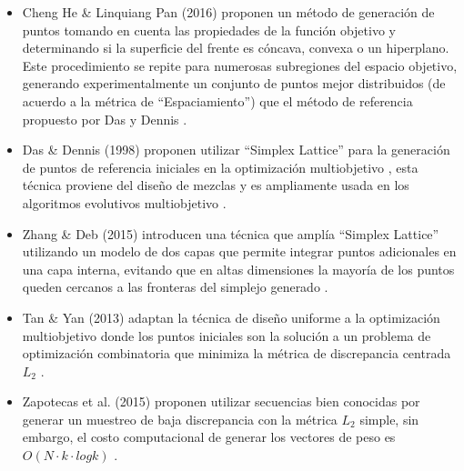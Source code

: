 \documentclass[letterpaper,10pt]{article}
\begin{document}



\begin{itemize}
 \item Cheng He \& Linquiang Pan (2016) proponen un método de generación de puntos tomando en cuenta las propiedades de la función objetivo y determinando si la superficie del frente es cóncava, convexa o un hiperplano. Este procedimiento se repite para numerosas subregiones del espacio objetivo, generando experimentalmente un conjunto de puntos mejor distribuidos (de acuerdo a la métrica de ``Espaciamiento'') que el método de referencia propuesto por Das y Dennis \cite{7748353}.    
 \item Das \& Dennis (1998) proponen utilizar ``Simplex Lattice'' para la generación de puntos de referencia iniciales en la optimización multiobjetivo \cite{Das:1998:NIN:588907.589322}, esta técnica proviene del diseño de mezclas y es ampliamente usada en los algoritmos evolutivos multiobjetivo \cite{4358754,6600851}.
 \item Zhang \& Deb (2015) introducen una técnica que amplía ``Simplex Lattice'' utilizando un modelo de dos capas que permite integrar puntos adicionales en una capa interna, evitando que en altas dimensiones la mayoría de los puntos queden cercanos a las fronteras del simplejo generado \cite{li2015evolutionary}.
 \item Tan \& Yan (2013) adaptan la técnica de diseño uniforme \cite{fang2000uniform} a la optimización multiobjetivo donde los puntos iniciales son la solución a un problema de optimización combinatoria que minimiza la métrica de discrepancia centrada $L_2$ \cite{tan2013moea,fang2002centered}.
 \item Zapotecas et al. (2015) proponen utilizar secuencias bien conocidas por generar un muestreo de baja discrepancia con la métrica $L_2$ simple, sin embargo, el costo computacional de generar los vectores de peso es $O(N \cdot k \cdot log k)$ \cite{zapotecas2015low}.
\end{itemize}
\end{document}
